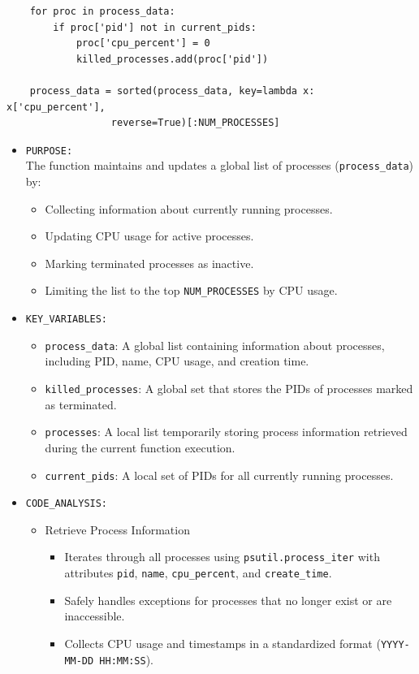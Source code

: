 \documentclass[12pt]{article}
\begin{document}
\begin{itemize}
\begin{verbatim}
    for proc in process_data:
        if proc['pid'] not in current_pids:
            proc['cpu_percent'] = 0
            killed_processes.add(proc['pid'])

    process_data = sorted(process_data, key=lambda x: x['cpu_percent'],
                  reverse=True)[:NUM_PROCESSES]
\end{verbatim}

 \begin{itemize}
    \item \texttt{PURPOSE:}
    \\
       The function maintains and updates a global list of processes (\texttt{process\_data}) by:
\begin{itemize}
    \item Collecting information about currently running processes.
    \item Updating CPU usage for active processes.
    \item Marking terminated processes as inactive.
    \item Limiting the list to the top \texttt{NUM\_PROCESSES} by CPU usage.
\end{itemize}
    
   \item \texttt{KEY\_VARIABLES:}
   \begin{itemize}
    \item \texttt{process\_data}: A global list containing information about processes, including PID, name, CPU usage, and creation time.
    \item \texttt{killed\_processes}: A global set that stores the PIDs of processes marked as terminated.
    \item \texttt{processes}: A local list temporarily storing process information retrieved during the current function execution.
    \item \texttt{current\_pids}: A local set of PIDs for all currently running processes.
\end{itemize}
   \item \texttt{CODE\_ANALYSIS:}
   \begin{itemize}
       \item {Retrieve Process Information}
\begin{itemize}
    \item Iterates through all processes using \texttt{psutil.process\_iter} with attributes \texttt{pid}, \texttt{name}, \texttt{cpu\_percent}, and \texttt{create\_time}.
    \item Safely handles exceptions for processes that no longer exist or are inaccessible.
    \item Collects CPU usage and timestamps in a standardized format (\texttt{YYYY-MM-DD HH:MM:SS}).
\end{itemize}


\end{itemize}
\end{itemize}
\end{itemize}
\end{document}

